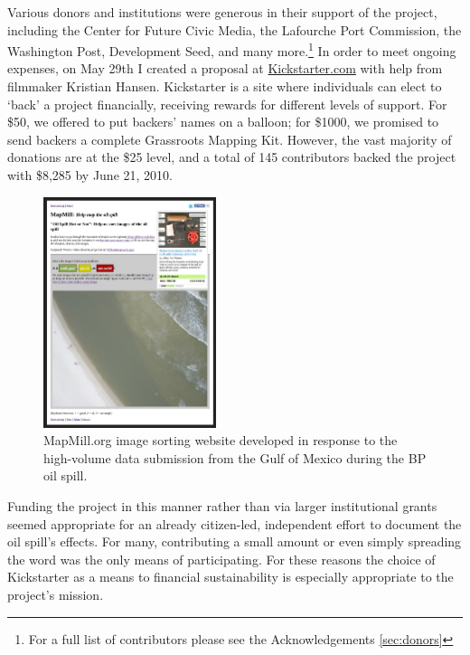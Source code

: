\documentclass[11pt,oneside,notitlepage]{report}
\begin{document}
{{Various donors and institutions were generous in their support of the project, including the Center for Future Civic Media, the Lafourche Port Commission, the Washington Post, Development Seed, and many more.\footnote{For a full list of contributors please see the Acknowledgements \ref{sec:donors}} In order to meet ongoing expenses, on May 29th I created a proposal at \href{http://kickstarter.com}{Kickstarter.com} with help from filmmaker Kristian Hansen. Kickstarter is a site where individuals can elect to `back' a project financially, receiving rewards for different levels of support. For \$50, we offered to put backers' names on a balloon; for \$1000, we promised to send backers a complete Grassroots Mapping Kit. However, the vast majority of donations are at the \$25 level, and a total of 145 contributors backed the project with \$8,285 by June 21, 2010.

\begin{figure}
	\begin{flushright}
		\includegraphics[width=0.45\textwidth]{images/mapmill.png}
		\caption{MapMill.org image sorting website developed in response to the high-volume data submission from the Gulf of Mexico during the BP oil spill.}
	\end{flushright}
\end{figure}

Funding the project in this manner rather than via larger institutional grants seemed appropriate for an already citizen-led, independent effort to document the oil spill's effects. For many, contributing a small amount or even simply spreading the word was the only means of participating. For these reasons the choice of Kickstarter as a means to financial sustainability is especially appropriate to the project's mission. 

}}
\end{document}
